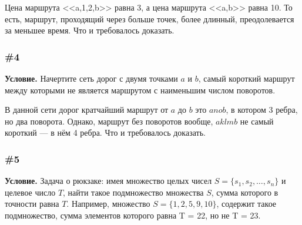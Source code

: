 \documentclass{article}
\begin{document}

Цена маршрута <<a,1,2,b>> равна 3, а цена маршрута <<a,b>> равна 10.
То есть, маршрут, проходящий через больше точек, более длинный, преодолевается за меньшее время.
Что и требовалось доказать.

\subsubsection{\#4}

\textbf{Условие.}
Начертите сеть дорог с двумя точками \(a\) и \(b\),
самый короткий маршрут между которыми не является маршрутом с наименьшим числом поворотов.


В данной сети дорог кратчайший маршрут от \(a\) до \(b\) это \(anob\), в котором 3 ребра,
но два поворота.
Однако, маршрут без поворотов вообще, \(aklmb\) не самый короткий --- в нём 4 ребра.
Что и требовалось доказать.

\subsubsection{\#5}

\textbf{Условие.}
Задача о рюкзаке: имея множество целых чисел \(S = \{s_1, s_2, \ldots, s_n \}\) и целевое число \(T\),
найти такое подмножество множества \(S\), сумма которого в точности равна \(T\).
Например, множество \(S = \{1, 2, 5, 9, 10\}\), содержит такое подмножество, сумма элементов которого равна T = 22,
но не T = 23.
\end{document}
